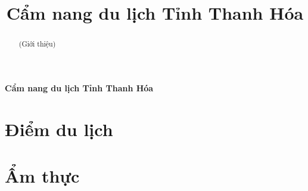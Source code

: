 \documentclass{article}
\title{Cẩm nang du lịch Tỉnh Thanh Hóa}
\begin{document}
\begin{center}
    \fontsize{18}{20}\textbf{Cẩm nang du lịch Tỉnh Thanh Hóa}
\end{center}
\begin{abstract}
    (Giới thiệu)
\end{abstract}
\section*{Điểm du lịch}
\newpage
\section*{{Ẩm thực}}
\end{document}
